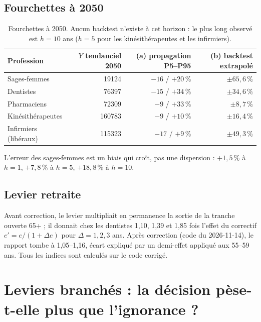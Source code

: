 \subsection{Fourchettes à 2050}
\begin{table}[h]\centering\small
\begin{tabular}{lrrr}
\toprule
Profession & $Y$ tendanciel 2050 & (a) propagation P5--P95 & (b) backtest extrapolé \\
\midrule
Sages-femmes & \num{19124}\mesure{} & $-16$ / $+20$\,\%\mesure{} & $\pm 65{,}6$\,\%\derive{} \\
Dentistes & \num{76397}\mesure{} & $-15$ / $+34$\,\%\mesure{} & $\pm 34{,}6$\,\%\derive{} \\
Pharmaciens & \num{72309}\mesure{} & $-9$ / $+33$\,\%\mesure{} & $\pm 8{,}7$\,\%\derive{} \\
Kinésithérapeutes & \num{160783}\mesure{} & $-9$ / $+10$\,\%\mesure{} & $\pm 16{,}4$\,\%\derive{} \\
Infirmiers (libéraux) & \num{115323}\mesure{} & $-17$ / $+9$\,\%\mesure{} & $\pm 49{,}3$\,\%\derive{} \\
\bottomrule
\end{tabular}
\caption{Fourchettes à 2050. Aucun backtest n'existe à cet horizon : le plus long observé est $h = 10$ ans
($h = 5$ pour les kinésithérapeutes et les infirmiers).}\label{a5-tab:band}
\end{table}

L'erreur des sages-femmes est un biais qui croît, pas une dispersion : $+1{,}5$\,\%\mesure{} à $h = 1$,
$+7{,}8$\,\%\mesure{} à $h = 5$, $+18{,}8$\,\%\mesure{} à $h = 10$.

\subsection{Levier retraite}
Avant correction, le levier multipliait en permanence la sortie de la tranche ouverte 65+ ; il donnait chez les
dentistes 1,10, 1,39 et 1,85\mesure{} fois l'effet du correctif $e' = e/(1+\Delta e)$ pour $\Delta = 1, 2, 3$ ans.
Après correction (code du 2026-11-14), le rapport tombe à 1,05--1,16\mesure{}, écart expliqué par un demi-effet
appliqué aux 55--59 ans. Tous les indices sont calculés sur le code corrigé.

\section{Leviers branchés : la décision pèse-t-elle plus que l'ignorance ?}\label{a5-sec:lev}
